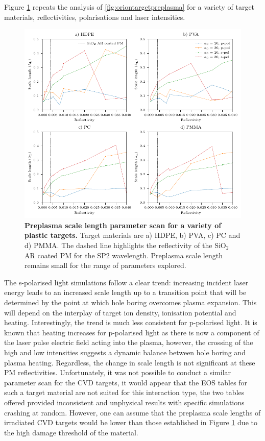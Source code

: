 Figure \ref{fig:orionscalelengthparameterscan} repeats the analysis of \ref{fig:oriontargetpreplasma} for a variety of target materials, reflectivities, polarisations and laser intensities.
\begin{figure}
	\centering
	\includegraphics{figures/orion/orion_scale_length_parameter_scan}
	\caption[Preplasma scale length parameter scan.]{\textbf{Preplasma scale length parameter scan for a variety of plastic targets.} Target materials are a) HDPE, b) PVA, c) PC and d) PMMA. The dashed line highlights the reflectivity of the SiO$_2$ AR coated PM for the SP2 wavelength. Preplasma scale length remains small for the range of parameters explored.}
	\label{fig:orionscalelengthparameterscan}
\end{figure}
The s-polarised light simulations follow a clear trend: increasing incident laser energy leads to an increased scale length up to a transition point that will be determined by the point at which hole boring overcomes plasma expansion. This will depend on the interplay of target ion density, ionisation potential and heating. Interestingly, the trend is much less consistent for p-polarised light. It is known that heating increases for p-polarised light as there is now a component of the laser pulse electric field acting into the plasma, however, the crossing of the high and low intensities suggests a dynamic balance between hole boring and plasma heating. Regardless, the change in scale length is not significant at these PM reflectivities. Unfortunately, it was not possible to conduct a similar parameter scan for the CVD targets, it would appear that the EOS tables for such a target material are not suited for this interaction type, the two tables offered provided inconsistent and unphysical results with specific simulations crashing at random. However, one can assume that the preplasma scale lengths of irradiated CVD targets would be lower than those established in Figure \ref{fig:orionscalelengthparameterscan} due to the high damage threshold of the material. 

